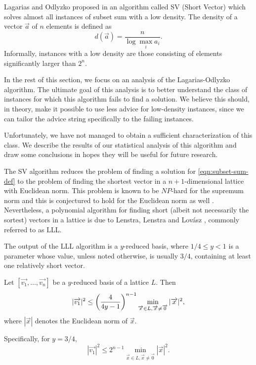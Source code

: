 Lagarias and Odlyzko proposed in \cite{lagarias-odlyzko} an algorithm
called SV (Short Vector) which solves almost all instances of subset sum
with a low density. The density of a vector $\vec{a}$ of $n$ elements is
defined as
$$
    d(\vec{a}) = \frac{n}{\log\max\limits_ia_i}.
$$
Informally, instances with a low density are those consisting of elements
significantly larger than $2^n$.

In the rest of this section, we focus on an analysis of the
Lagarias-Odlyzko algorithm. The ultimate goal of this analysis is to
better understand the class of instances for which this algorithm fails to
find a solution. We believe this should, in theory, make it possible to
use less advice for low-density instances, since we can tailor the advice
string specifically to the failing instances.

Unfortunately, we have not managed to obtain a sufficient characterization
of this class. We describe the results of our statistical analysis of this
algorithm and draw some conclusions in hopes they will be useful for
future research.

The SV algorithm reduces the problem of finding a solution for
\eqref{eqn:subset-sum-def} to the problem of finding the shortest vector
in a $n+1$-dimensional lattice with Euclidean norm. This problem is known
to be $NP$-hard for the supremum norm and this is conjectured to hold for
the Euclidean norm as well \cite{van-emde-boas-shortest-vector}.
Nevertheless, a polynomial algorithm for finding short (albeit not
necessarily the sortest) vectors in a lattice is due to Lenstra, Lenstra
and Lovász \cite{LLL}, commonly referred to as LLL.

The output of the LLL algorithm is a $y$-reduced basis, where $1/4 \leq y
< 1$ is a parameter whose value, unless noted otherwise, is usually $3/4$,
containing at least one relatively short vector.

\begin{theorem}\label{theorem:LLL-short-vector}
    Let $[\vec{v_1}, \dots, \vec{v_n}]$ be a $y$-reduced basis of a
    lattice $L$. Then
    \begin{equation}\label{eqn:lll-y-reduced}
        |\vec{v_1}|^2 \leq \paren*{\frac{4}{4y-1}}^{n-1}
        \min\limits_{\vec{x} \in L, \vec{x} \not= \vec{0}} |\vec{x}|^2,
    \end{equation}
    where $|\vec{x}|$ denotes the Euclidean norm of $\vec{x}$.

    Specifically, for $y = 3/4$,
    \begin{equation}\label{eqn:lll-3/4-reduced}
        |\vec{v_1}|^2 \leq 2^{n-1} \min\limits_{\vec{x} \in L, \vec{x}
        \not= \vec{0}} |\vec{x}|^2.
    \end{equation}
\end{theorem}

